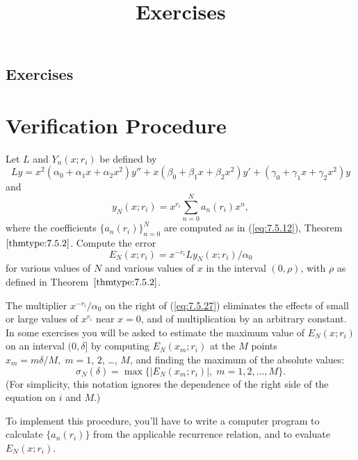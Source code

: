 \documentclass{ximera}
\title{Exercises} \license{CC BY-NC-SA 4.0}
\begin{document}
\begin{abstract}
\end{abstract}
\maketitle

\begin{onlineOnly}
\section*{Exercises}
\end{onlineOnly}




\section*{Verification Procedure}

Let $L$ and
$Y_n(x; r_i)$ be defined by
$$
Ly=
x^2(\alpha_0+\alpha_1x+\alpha_2x^2)y''+x(\beta_0+\beta_1x+\beta_2x^2)y'
+(\gamma_0+\gamma_1x+\gamma_2x^2)y
$$
and
$$
y_N(x;r_i)=x^{r_i}\sum_{n=0}^N a_n(r_i)x^n,
$$
where the coefficients $\{a_n(r_i)\}_{n=0}^N$ are computed as in
(\ref{eq:7.5.12}), Theorem~$\ref{thmtype:7.5.2}$. Compute the error
\begin{equation} \label{eq:7.5.27}
E_N(x;r_i)=x^{-r_i}Ly_N(x;r_i)/\alpha_0
\end{equation}
for various values of $N$ and various values of $x$ in the interval
$(0,\rho)$, with $\rho$ as defined in Theorem~$\ref{thmtype:7.5.2}$.

The multiplier $x^{-r_i}/\alpha_0$ on the right of (\ref{eq:7.5.27})
eliminates the effects of small or large values of $x^{r_i}$ near
$x=0$, and of multiplication by an arbitrary constant. In some
exercises you will be asked to estimate the maximum value of
$E_N(x; r_i)$ on an interval $(0,\delta]$ by computing $E_N(x_m;r_i)$
at the $M$ points $x_m=m\delta/M,\; m=1$, $2$, \dots, $M$, and finding the
maximum of the absolute values:
\begin{equation} \label{eq:7.5.28}
\sigma_N(\delta)=\max\{|E_N(x_m;r_i)|,\;   m=1,2,\dots,M\}.
\end{equation}
(For simplicity, this notation ignores the dependence of
the right side of the equation on $i$ and $M$.)

To implement this procedure, you'll have to write a computer program to
calculate $\{a_n(r_i)\}$ from the applicable recurrence relation, and
to evaluate $E_N(x;r_i)$.
\end{document}
